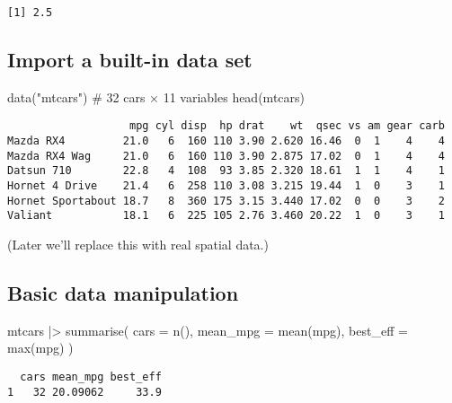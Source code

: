 \documentclass[
  letterpaper,
  DIV=11,
  numbers=noendperiod]{scrreprt}
\newenvironment{Shaded}{\begin{snugshade}}{\end{snugshade}}
\newcommand{\AttributeTok}[1]{\textcolor[rgb]{0.40,0.45,0.13}{#1}}
\newcommand{\CommentTok}[1]{\textcolor[rgb]{0.37,0.37,0.37}{#1}}
\newcommand{\FunctionTok}[1]{\textcolor[rgb]{0.28,0.35,0.67}{#1}}
\newcommand{\NormalTok}[1]{\textcolor[rgb]{0.00,0.23,0.31}{#1}}
\newcommand{\SpecialCharTok}[1]{\textcolor[rgb]{0.37,0.37,0.37}{#1}}
\newcommand{\StringTok}[1]{\textcolor[rgb]{0.13,0.47,0.30}{#1}}
\begin{document}
\begin{verbatim}
[1] 2.5
\end{verbatim}

\hypertarget{import-a-built-in-data-set}{%
\subsection{Import a built-in data
set}\label{import-a-built-in-data-set}}

\begin{Shaded}
\begin{Highlighting}[]
\FunctionTok{data}\NormalTok{(}\StringTok{"mtcars"}\NormalTok{)   }\CommentTok{\# 32 cars × 11 variables}
\FunctionTok{head}\NormalTok{(mtcars)}
\end{Highlighting}
\end{Shaded}

\begin{verbatim}
                   mpg cyl disp  hp drat    wt  qsec vs am gear carb
Mazda RX4         21.0   6  160 110 3.90 2.620 16.46  0  1    4    4
Mazda RX4 Wag     21.0   6  160 110 3.90 2.875 17.02  0  1    4    4
Datsun 710        22.8   4  108  93 3.85 2.320 18.61  1  1    4    1
Hornet 4 Drive    21.4   6  258 110 3.08 3.215 19.44  1  0    3    1
Hornet Sportabout 18.7   8  360 175 3.15 3.440 17.02  0  0    3    2
Valiant           18.1   6  225 105 2.76 3.460 20.22  1  0    3    1
\end{verbatim}

(Later we'll replace this with real spatial data.)

\hypertarget{basic-data-manipulation}{%
\subsection{Basic data manipulation}\label{basic-data-manipulation}}

\begin{Shaded}
\begin{Highlighting}[]
\NormalTok{mtcars }\SpecialCharTok{|\textgreater{}}
  \FunctionTok{summarise}\NormalTok{(}
    \AttributeTok{cars        =} \FunctionTok{n}\NormalTok{(),}
    \AttributeTok{mean\_mpg    =} \FunctionTok{mean}\NormalTok{(mpg),}
    \AttributeTok{best\_eff    =} \FunctionTok{max}\NormalTok{(mpg)}
\NormalTok{  )}
\end{Highlighting}
\end{Shaded}

\begin{verbatim}
  cars mean_mpg best_eff
1   32 20.09062     33.9
\end{verbatim}
\end{document}
